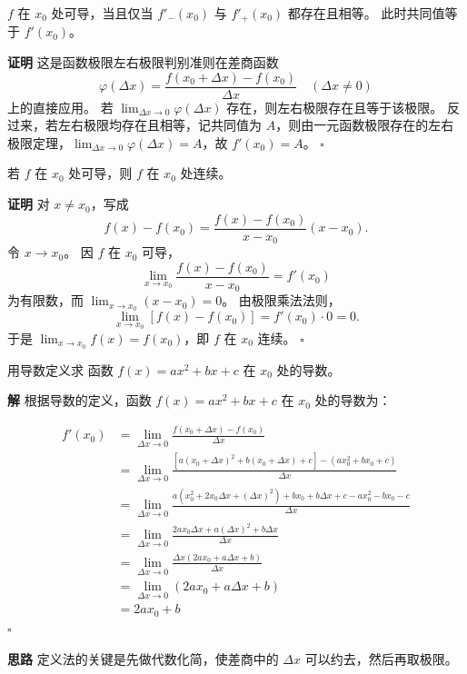 \documentclass[fontset=fandol]{ctexart}
\newenvironment{proofdetail}{\par\noindent\textbf{证明}\quad}{\hfill$\square$\par\vspace{0.8em}}
\newenvironment{solution}{\par\noindent\textbf{解}\quad}{\hfill$\square$\par\vspace{0.8em}}
\newenvironment{idea}{\par\noindent\textbf{思路}\quad}{\par\vspace{0.4em}}
\begin{document}
\begin{proposition}[可导的充要条件]
$f$ 在 $x_0$ 处可导，当且仅当 $f'_-(x_0)$ 与 $f'_+(x_0)$ 都存在且相等。 此时共同值等于 $f'(x_0)$。
\end{proposition}
\begin{proofdetail}
这是函数极限左右极限判别准则在差商函数
\[
\varphi(\Delta x)=\frac{f(x_0+\Delta x)-f(x_0)}{\Delta x}\quad(\Delta x\neq0)
\]
上的直接应用。 若 $\lim_{\Delta x\to0}\varphi(\Delta x)$ 存在，则左右极限存在且等于该极限。 反过来，若左右极限均存在且相等，记共同值为 $A$，则由一元函数极限存在的左右极限定理，$\lim_{\Delta x\to0}\varphi(\Delta x)=A$，故 $f'(x_0)=A$。
\end{proofdetail}

\begin{theorem}[可导必连续]
若 $f$ 在 $x_0$ 处可导，则 $f$ 在 $x_0$ 处连续。
\end{theorem}
\begin{proofdetail}
对 $x\neq x_0$，写成
\[
f(x)-f(x_0)=\frac{f(x)-f(x_0)}{x-x_0}(x-x_0).
\]
令 $x\to x_0$。 因 $f$ 在 $x_0$ 可导，
\[
\lim_{x\to x_0}\frac{f(x)-f(x_0)}{x-x_0}=f'(x_0)
\]
为有限数，而 $\lim_{x\to x_0}(x-x_0)=0$。 由极限乘法法则，
\[
\lim_{x\to x_0}[f(x)-f(x_0)]=f'(x_0)\cdot0=0.
\]
于是 $\lim_{x\to x_0}f(x)=f(x_0)$，即 $f$ 在 $x_0$ 连续。
\end{proofdetail}

\begin{example}[用定义求导]
用导数定义求 函数 $f(x) = ax^2 + bx + c$ 在 $x_0$ 处的导数。
\end{example}
\begin{solution}
根据导数的定义，函数 $f(x) = ax^2 + bx + c$ 在 $x_0$ 处的导数为：

\begin{align*}
	f'(x_0) &= \lim_{\Delta x \to 0} \frac{f(x_0 + \Delta x) - f(x_0)}{\Delta x} \\
	&= \lim_{\Delta x \to 0} \frac{[a(x_0 + \Delta x)^2 + b(x_0 + \Delta x) + c] - (ax_0^2 + bx_0 + c)}{\Delta x} \\
	&= \lim_{\Delta x \to 0} \frac{a(x_0^2 + 2x_0\Delta x + (\Delta x)^2) + bx_0 + b\Delta x + c - ax_0^2 - bx_0 - c}{\Delta x} \\
	&= \lim_{\Delta x \to 0} \frac{2ax_0\Delta x + a(\Delta x)^2 + b\Delta x}{\Delta x} \\
	&= \lim_{\Delta x \to 0} \frac{\Delta x(2ax_0 + a\Delta x + b)}{\Delta x} \\
	&= \lim_{\Delta x \to 0} (2ax_0 + a\Delta x + b) \\
	&= 2ax_0 + b
\end{align*}
\end{solution}
\begin{idea}
定义法的关键是先做代数化简，使差商中的 $\Delta x$ 可以约去，然后再取极限。
\end{idea}
\end{document}

